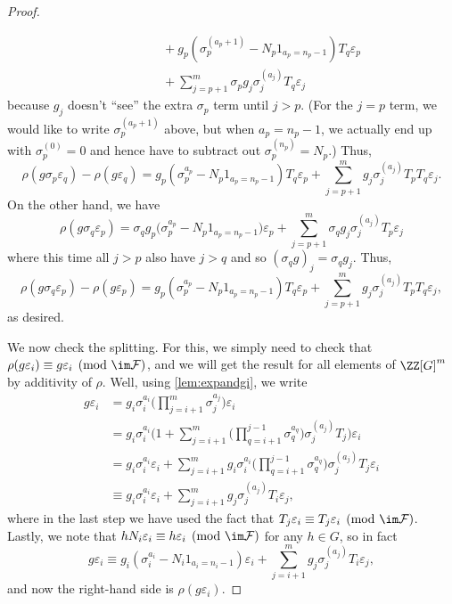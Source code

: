 \documentclass{article}
\numberwithin{equation}{section}
\begin{document}
\begin{proof}
\begin{itemize}
\begin{align*}
			&\qquad\qquad+g_p\left(\sigma_p^{(a_p+1)}-N_p1_{a_p=n_p-1}\right)T_q\varepsilon_p \\
			&\qquad\qquad+\sum_{j=p+1}^m\sigma_pg_j\sigma_j^{(a_j)}T_q\varepsilon_j
		\end{align*}
		because $g_j$ doesn't ``see'' the extra $\sigma_p$ term until $j>p$. (For the $j=p$ term, we would like to write $\sigma_p^{(a_p+1)}$ above, but when $a_p=n_p-1$, we actually end up with $\sigma_p^{(0)}=0$ and hence have to subtract out $\sigma_p^{(n_p)}=N_p$.) Thus,
		\[\rho(g\sigma_p\varepsilon_q)-\rho(g\varepsilon_q) = g_p\left(\sigma_p^{a_p}-N_p1_{a_p=n_p-1}\right)T_q\varepsilon_p+\sum_{j=p+1}^mg_j\sigma_j^{(a_j)}T_pT_q\varepsilon_j.\]
		On the other hand, we have
		\[\rho(g\sigma_q\varepsilon_p) = \sigma_qg_p\big(\sigma_p^{a_p}-N_p1_{a_p=n_p-1}\big)\varepsilon_p+\sum_{j=p+1}^m\sigma_qg_j\sigma_j^{(a_j)}T_p\varepsilon_j\]
		where this time all $j>p$ also have $j>q$ and so $(\sigma_qg)_j=\sigma_qg_j$. Thus,
		\[\rho(g\sigma_q\varepsilon_p)-\rho(g\varepsilon_p) = g_p\left(\sigma_p^{a_p}-N_p1_{a_p=n_p-1}\right)T_q\varepsilon_p+\sum_{j=p+1}^mg_j\sigma_j^{(a_j)}T_pT_q\varepsilon_j,\]
		as desired.
	\end{itemize}
	We now check the splitting. For this, we simply need to check that $\rho(g\varepsilon_i)\equiv g\varepsilon_i\pmod{\im\mathcal F}$, and we will get the result for all elements of $\ZZ[G]^m$ by additivity of $\rho$. Well, using \autoref{lem:expandgi}, we write
	\begin{align*}
		g\varepsilon_i &= g_i\sigma_i^{a_i}\Bigg(\prod_{j=i+1}^m\sigma_j^{a_j}\Bigg)\varepsilon_i \\
		&= g_i\sigma_i^{a_i}\Bigg(1+\sum_{j=i+1}^m\Bigg(\prod_{q=i+1}^{j-1}\sigma_q^{a_q}\Bigg)\sigma_j^{(a_j)}T_j\Bigg)\varepsilon_i \\
		&= g_i\sigma_i^{a_i}\varepsilon_i+\sum_{j=i+1}^mg_i\sigma_i^{a_i}\Bigg(\prod_{q=i+1}^{j-1}\sigma_q^{a_q}\Bigg)\sigma_j^{(a_j)}T_j\varepsilon_i \\
		&\equiv g_i\sigma_i^{a_i}\varepsilon_i+\sum_{j=i+1}^mg_j\sigma_j^{(a_j)}T_i\varepsilon_j,
	\end{align*}
	where in the last step we have used the fact that $T_j\varepsilon_i\equiv T_j\varepsilon_i\pmod{\im\mathcal F}$. Lastly, we note that $hN_i\varepsilon_i\equiv h\varepsilon_i\pmod{\im\mathcal F}$ for any $h\in G$, so in fact
	\[g\varepsilon_i\equiv g_i\left(\sigma_i^{a_i}-N_i1_{a_i=n_i-1}\right)\varepsilon_i+\sum_{j=i+1}^mg_j\sigma_j^{(a_j)}T_i\varepsilon_j,\]
	and now the right-hand side is $\rho(g\varepsilon_i)$.
\end{proof}
\end{document}
